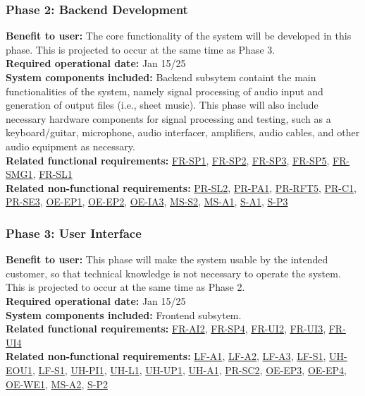 \documentclass[12pt]{article}
\begin{document}
\subsubsection*{Phase 2: Backend Development}
\textbf{Benefit to user:} The core functionality of the system will be developed in this phase. This is projected to occur at the same time as Phase 3.\\
\textbf{Required operational date:} Jan 15/25 \\
\textbf{System components included:} Backend subsytem containt the main functionalities of the system, namely signal processing of audio input and generation of output files (i.e., sheet music). 
                                     This phase will also include necessary hardware components for signal processing and testing, such as a keyboard/guitar, microphone, audio interfacer, amplifiers, audio cables, and other audio equipment as necessary.\\
\textbf{Related functional requirements:} \hyperref[FR-SP1]{FR-SP1}, \hyperref[FR-SP2]{FR-SP2}, \hyperref[FR-SP3]{FR-SP3}, \hyperref[FR-SP5]{FR-SP5}, \hyperref[FR-SMG1]{FR-SMG1}, \hyperref[FR-SL1]{FR-SL1}\\
\textbf{Related non-functional requirements:} \hyperref[PR-SL2]{PR-SL2}, \hyperref[PR-PA1]{PR-PA1}, \hyperref[PR-RFT5]{PR-RFT5}, \hyperref[PR-C1]{PR-C1}, \hyperref[PR-SE3]{PR-SE3}, \hyperref[OE-EP1]{OE-EP1}, 
\hyperref[OE-EP2]{OE-EP2}, \hyperref[OE-IA3]{OE-IA3}, \hyperref[MS-S2]{MS-S2}, \hyperref[MS-A1]{MS-A1}, \hyperref[S-A1]{S-A1}, \hyperref[S-P3]{S-P3} \\

\subsubsection*{Phase 3: User Interface}
\textbf{Benefit to user:} This phase will make the system usable by the intended customer, so that technical knowledge is not necessary to operate the system. This is projected to occur at the same time as Phase 2. \\
\textbf{Required operational date:} Jan 15/25 \\
\textbf{System components included:} Frontend subsytem. \\
\textbf{Related functional requirements:} \hyperref[FR-AI2]{FR-AI2}, \hyperref[FR-SP4]{FR-SP4}, \hyperref[FR-UI2]{FR-UI2}, \hyperref[FR-UI3]{FR-UI3}, \hyperref[FR-UI4]{FR-UI4}\\
\textbf{Related non-functional requirements:} \hyperref[LF-A1]{LF-A1}, \hyperref[LF-A2]{LF-A2}, \hyperref[LF-A3]{LF-A3}, \hyperref[LF-S1]{LF-S1}, 
\hyperref[UH-EOU1]{UH-EOU1}, \hyperref[LF-S1]{LF-S1}, \hyperref[UH-PI1]{UH-PI1}, \hyperref[UH-L1]{UH-L1}, \hyperref[UH-UP1]{UH-UP1}, \hyperref[UH-A1]{UH-A1}, 
\hyperref[PR-SC2]{PR-SC2}, \hyperref[OE-EP3]{OE-EP3}, \hyperref[OE-EP4]{OE-EP4}, \hyperref[OE-WE1]{OE-WE1}, \hyperref[MS-A2]{MS-A2}, \hyperref[S-P2]{S-P2}\\
\end{document}
